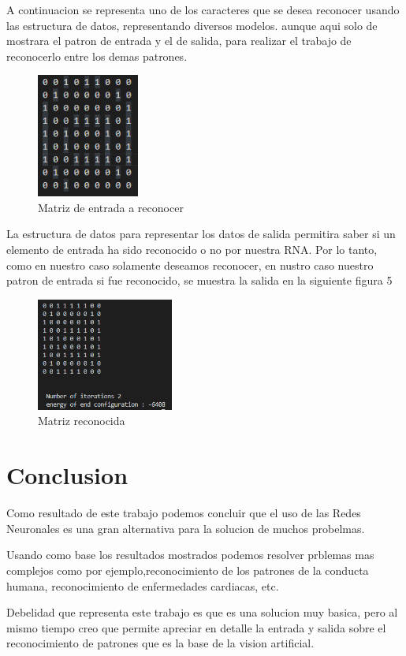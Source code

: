 \documentclass[10pt]{article}         %
\begin{document}
A continuacion se representa uno de los caracteres que se desea reconocer usando las estructura de datos, representando diversos modelos. aunque aqui solo de mostrara el patron de entrada y el de salida, para realizar el trabajo de reconocerlo entre los demas patrones.

\begin{figure}[htb]
\centering
\includegraphics[width=0.3\textwidth]{patron de entrada.png}
\caption{Matriz de entrada a reconocer}
\label{fig:tigre}
\end{figure}

La estructura de datos para representar los datos de salida permitira saber si un elemento de entrada ha sido reconocido o no por nuestra RNA. Por lo tanto, como en nuestro caso solamente deseamos reconocer, en nustro caso nuestro patron de entrada si fue reconocido, se muestra la salida en la siguiente figura 5

\begin{figure}[htb]
\centering
\includegraphics[width=0.4\textwidth]{patron de salida.png}
\caption{Matriz reconocida}
\label{fig:tigre}
\end{figure}
\section{Conclusion}
 Como resultado de este trabajo podemos concluir que el uso de las Redes Neuronales es una gran alternativa para la solucion de muchos probelmas.

Usando como base los resultados mostrados podemos resolver prblemas mas complejos como por ejemplo,reconocimiento de los patrones de la conducta humana, reconocimiento de enfermedades cardiacas, etc.

Debelidad que representa este trabajo es que es una solucion muy basica, pero al mismo tiempo creo que permite apreciar en detalle la entrada y salida sobre el reconocimiento de patrones que es la base de la vision artificial. 
\end{document}
